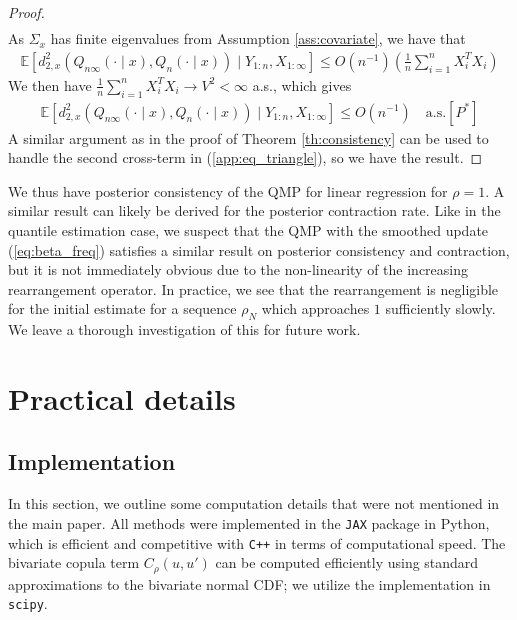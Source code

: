 \documentclass[11pt,a4paper]{article}
\newcommand{\E}{\mathbb{E}}
\begin{document}
\begin{appendices}
\begin{proof}
\begin{align*}
\end{align*}
As $\Sigma_x$ has finite eigenvalues from {Assumption \ref{ass:covariate}}, we have that
\begin{align*}
\E\left[{d}^2_{2,x}(Q_{n\infty}(\cdot \mid x), Q_n(\cdot \mid x))\mid Y_{1:n}, X_{1:\infty}\right]\leq O(n^{-1})\left(\frac{1}{n}\sum_{i = 1}^n X_i^T X_i\right)
\end{align*}
We then have $\frac{1}{n}\sum_{i = 1}^n X_i^T X_i \to V^2 < \infty$ a.s., which gives
\begin{align*}
\E\left[{d}^2_{2,x}(Q_{n\infty}(\cdot \mid x), Q_n(\cdot \mid x))\mid Y_{1:n}, X_{1:\infty}\right]\leq O(n^{-1}) \quad \text{a.s.}[P^*]
\end{align*}
A similar argument as in the proof of {Theorem \ref{th:consistency}} can be used to handle the second cross-term in (\ref{app:eq_triangle}), so we have the result.
 \end{proof}
 We thus have posterior consistency of the QMP for linear regression for $\rho = 1$.
A similar result can  likely be derived for the posterior contraction rate. Like in the quantile estimation case, we suspect that the QMP with the smoothed update (\ref{eq:beta_freq}) satisfies a similar result on posterior consistency and contraction, but it is not immediately obvious due to the non-linearity of the increasing rearrangement operator. In practice, we see that the rearrangement is negligible for the initial estimate for a sequence $\rho_N$ which approaches $1$ sufficiently slowly. We leave a thorough investigation of this for future work. 



\section{Practical details}

\subsection{Implementation}

In this section, we outline some computation details that were not mentioned in the main paper. All methods were implemented in the \texttt{JAX} package in Python, which is efficient and competitive with \texttt{C++} in terms of computational speed. The bivariate copula term $C_{\rho}(u,u')$ can be computed efficiently using standard approximations to the bivariate normal CDF; we utilize the implementation in \texttt{scipy}. 


\end{appendices}
\end{document}
